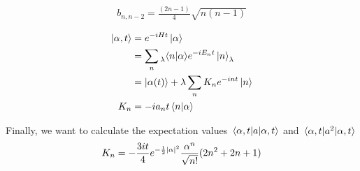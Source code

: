 \documentclass[a4paper, 12pt, fleqn]{article}
\begin{document}
  \begin{align}
    b_{n, n-2} = \frac{(2n-1)}{4} \sqrt{n(n-1)} 
  \end{align}
  
  \begin{align}
    \ket{\alpha, t} &= e^{-i H t} \ket{\alpha} \\
    &= \sum_{n} \prescript{}{\lambda}{\braket{n}{\alpha}} e^{-i E_n t} \ket{n}_{\lambda} \\
    &= \ket{\alpha(t)} + \lambda \sum_{n} K_n e^{-i n t} \ket{n} \\
    K_n &= -i a_n t \braket{n}{\alpha}
  \end{align}

  Finally, we want to calculate the expectation values $\mel{\alpha, t}{a}{\alpha, t}$ and $\mel{\alpha, t}{a^2}{\alpha, t}$
  \begin{align}
    K_n = -\frac{3it}{4} e^{-\frac{1}{2} \abs{\alpha}^2} \frac{\alpha^n}{\sqrt{n!}} (2n^2 + 2n + 1)
  \end{align}

  


  \medskip

  \printbibliography[heading=bibintoc, title={References}]
\end{document}
